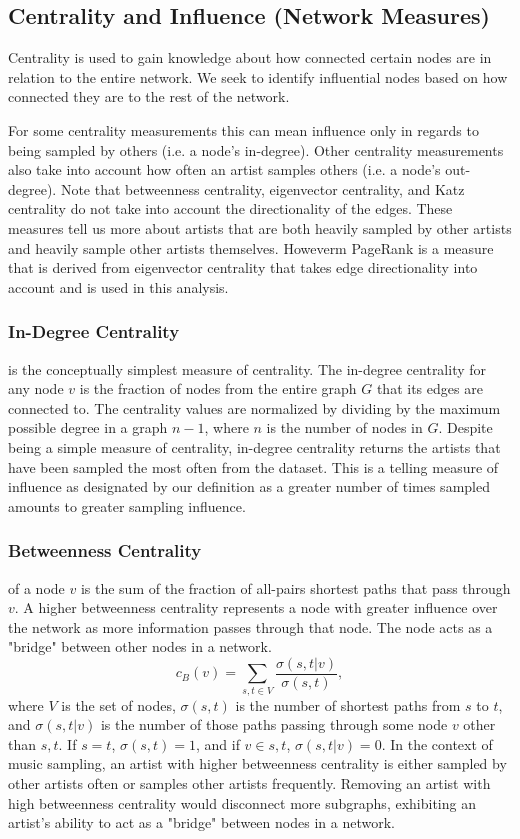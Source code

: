\documentclass[pageno]{jpaper}
\begin{document}
\subsection{Centrality and Influence (Network Measures)}
Centrality is used to gain knowledge about how connected certain nodes are in relation to the entire network. We seek to identify influential nodes based on how connected they are to the rest of the network. 

For some centrality measurements this can mean influence only in regards to being sampled by others (i.e. a node's in-degree). Other centrality measurements also take into account how often an artist samples others (i.e. a node's out-degree). Note that betweenness centrality, eigenvector centrality, and Katz centrality do not take into account the directionality of the edges. These measures tell us more about artists that are both heavily sampled by other artists and heavily sample other artists themselves. Howeverm PageRank is a measure that is derived from eigenvector centrality that takes edge directionality into account and is used in this analysis.
\subsubsection{In-Degree Centrality}
is the conceptually simplest measure of centrality. The in-degree centrality for any node $v$ is the fraction of nodes from the entire graph $G$ that its edges are connected to. The centrality values are normalized by dividing by the maximum possible degree in a graph $n-1$, where $n$ is the number of nodes in $G$. Despite being a simple measure of centrality, in-degree centrality returns the artists that have been sampled the most often from the dataset. This is a telling measure of influence as designated by our definition as a greater number of times sampled amounts to greater sampling influence.
\subsubsection{Betweenness Centrality}
of a node $v$ is the sum of the fraction of all-pairs shortest paths that pass through $v$. A higher betweenness centrality represents a node with greater influence over the network as more information passes through that node. The node acts as a "bridge" between other nodes in a network.
\begin{equation}
c_B(v) =\sum_{s,t \in V} \frac{\sigma(s, t|v)}{\sigma(s, t)},
\end{equation}
where $V$ is the set of nodes, $\sigma(s,t)$ is the number of shortest paths from $s$ to $t$, and $\sigma(s,t|v)$ is the number of those paths passing through some node $v$ other than $s,t$. If $s=t$, $\sigma(s,t)=1$, and if $v\in s,t$, $\sigma(s,t|v)=0$. In the context of music sampling, an artist with higher betweenness centrality is either sampled by other artists often or samples other artists frequently. Removing an artist with high betweenness centrality would disconnect more subgraphs, exhibiting an artist's ability to act as a "bridge" between nodes in a network.
\end{document}
